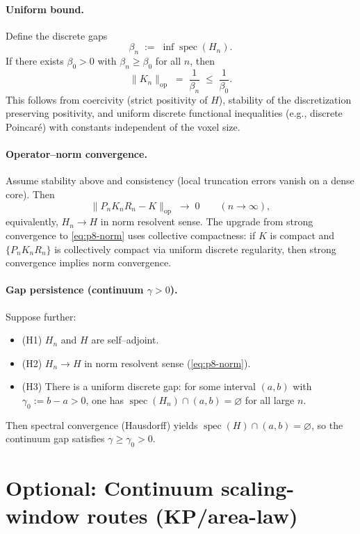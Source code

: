 \documentclass[11pt]{amsart}
\theoremstyle{plain}
\theoremstyle{definition}
\theoremstyle{remark}
\begin{document}
\paragraph{Uniform bound.}
Define the discrete gaps
\[
  \beta_n\;:=\;\inf \operatorname{spec}(H_n).
\]
If there exists $\beta_0>0$ with $\beta_n\ge \beta_0$ for all $n$, then
\[
  \lVert K_n\rVert_{\mathrm{op}}\;=\;\frac{1}{\beta_n}\;\le\;\frac{1}{\beta_0}.
\]
This follows from coercivity (strict positivity of $H$), stability of the discretization preserving positivity, and uniform discrete functional inequalities (e.g., discrete Poincar\'e) with constants independent of the voxel size.

\paragraph{Operator--norm convergence.}
Assume stability above and consistency (local truncation errors vanish on a dense core). Then
\begin{equation}
\label{eq:p8-norm}
  \big\lVert P_n K_n R_n - K\big\rVert_{\mathrm{op}}\;\longrightarrow\;0\qquad (n\to\infty),
\end{equation}
equivalently, $H_n\to H$ in norm resolvent sense. The upgrade from strong convergence to \eqref{eq:p8-norm} uses collective compactness: if $K$ is compact and $\{P_n K_n R_n\}$ is collectively compact via uniform discrete regularity, then strong convergence implies norm convergence.

\paragraph{Gap persistence (continuum $\gamma>0$).}
Suppose further:
\begin{itemize}
  \item (H1) $H_n$ and $H$ are self--adjoint.
  \item (H2) $H_n\to H$ in norm resolvent sense (\eqref{eq:p8-norm}).
  \item (H3) There is a uniform discrete gap: for some interval $(a,b)$ with $\gamma_0:=b-a>0$, one has $\operatorname{spec}(H_n)\cap(a,b)=\varnothing$ for all large $n$.
\end{itemize}
Then spectral convergence (Hausdorff) yields $\operatorname{spec}(H)\cap(a,b)=\varnothing$, so the continuum gap satisfies $\gamma\ge \gamma_0>0$.

\section{Optional: Continuum scaling-window routes (KP/area-law)}
\end{document}
